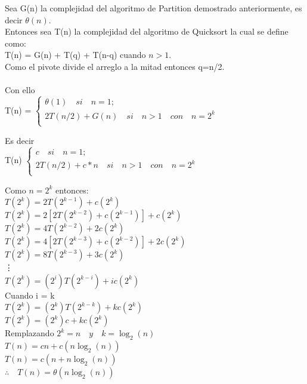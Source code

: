 \documentclass[spanish]{article}
\begin{document}
	Sea G(n) la complejidad del algoritmo de Partition demostrado anteriormente, es decir $\theta(n)$.\\
	Entonces sea T(n) la complejidad del algoritmo de Quicksort la cual se define como:\\
	T(n) = G(n) + T(q) + T(n-q) cuando $n>1$.\\
	Como el pivote divide el arreglo a la mitad entonces q=n/2.\\
	\\
	Con ello\\
	T(n) = 
	$
		\left\lbrace
		\begin{array}{l}
			\theta(1) \quad si \quad n = 1;\\
			2T(n/2) + G(n) \quad si \quad n>1 \quad con \quad n = 2^{k}\\
		\end{array}
		\right.
	$	
	\bigskip
	
	Es decir\\
	T(n)
	$
		\left\lbrace
		\begin{array}{l}
			c \quad si \quad n = 1;\\
			2T(n/2) + c*n \quad si \quad n>1 \quad  con  \quad n = 2^{k}\\
		\end{array}
		\right.
	$
	\bigskip
	
	Como $n = 2^{k}$ entonces:\\
	$T(2^{k})=2T(2^{k-1}) + c(2^{k})$\\
	$T(2^{k})=2[2T(2^{k-2}) + c(2^{k-1})] + c(2^{k})$\\
	$T(2^{k})=4T(2^{k-2}) + 2c(2^{k})$\\
	$T(2^{k})=4[2T(2^{k-3}) + c(2^{k-2})]+ 2c(2^{k})$\\
	$T(2^{k})=8T(2^{k-3}) + 3c(2^{k})$\\
	\hspace{1cm}\vdots\\
	$T(2^{k})=(2^{i})T(2^{k-i}) + ic(2^{k})$\\
	Cuando i = k\\
	$T(2^{k})=(2^{k})T(2^{k-k}) + kc(2^{k})$\\
	$T(2^{k})=(2^{k})c + kc(2^{k})$\\
	Remplazando $2^{k} = n \quad y \quad k=\log_{2}(n)$\\
	$T(n)=cn + c(n\log_{2}(n))$\\
	$T(n)=c(n + n\log_{2}(n))$\\
	$\therefore \quad T(n) = \theta(n\log_{2}(n))$	
	
\end{document}
